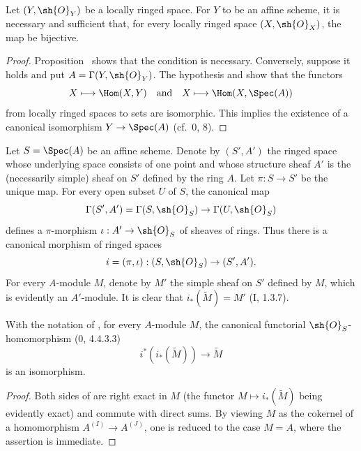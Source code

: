\begin{corollary}[1.8.3]
\label{ega2:addendum:I.1.8.3}
Let $(Y,\sh{O}_Y)$ be a locally ringed space.  For $Y$ to be an affine
scheme, it is necessary and sufficient that, for every locally ringed
space $(X,\sh{O}_X)$, the map  be bijective.
\end{corollary}

\begin{proof}
Proposition~ shows that the condition is necessary.
Conversely, suppose it holds and put $A=\Gamma(Y,\sh{O}_Y)$.  The
hypothesis and  show that the functors
\[
  X\longmapsto\Hom(X,Y)
  \quad\hbox{and}\quad
  X\longmapsto\Hom(X,\Spec(A))
\]
from locally ringed spaces to sets are isomorphic.  This implies the
existence of a canonical isomorphism $Y\to\Spec(A)$ (cf.~0, 8).
\end{proof}

\begin{env}[1.8.4]
\label{ega2:addendum:I.1.8.4}
Let $S=\Spec(A)$ be an affine scheme.  Denote by $(S',A')$ the ringed
space whose underlying space consists of one point and whose
structure sheaf $A'$ is the (necessarily simple) sheaf on $S'$ defined
by the ring $A$.  Let $\pi:S\to S'$ be the unique map.  For every open
subset $U$ of $S$, the canonical map
\[
  \Gamma(S',A')=\Gamma(S,\sh{O}_S)\to\Gamma(U,\sh{O}_S)
\]
defines a $\pi$-morphism $\iota:A'\to\sh{O}_S$ of sheaves of rings.
Thus there is a canonical morphism of ringed spaces
\[
  i=(\pi,\iota):(S,\sh{O}_S)\to(S',A').
\]
For every $A$-module $M$, denote by $M'$ the simple sheaf on $S'$
defined by $M$, which is evidently an $A'$-module.  It is clear that
$i_*(\widetilde M)=M'$ (I, 1.3.7).
\end{env}

\begin{lemma}[1.8.5]
\label{ega2:addendum:I.1.8.5}
With the notation of , for every $A$-module $M$, the
canonical functorial $\sh{O}_S$-homomorphism (0, 4.4.3.3)
\begin{equation}
\label{ega2:addendum:I.1.8.5.1}
  i^*(i_*(\widetilde M))\to\widetilde M
\tag{1.8.5.1}
\end{equation}
is an isomorphism.
\end{lemma}

\begin{proof}
Both sides of  are right exact in $M$ (the functor
$M\mapsto i_*(\widetilde M)$ being evidently exact) and commute with
direct sums.  By viewing $M$ as the cokernel of a homomorphism
$A^{(I)}\to A^{(J)}$, one is reduced to the case $M=A$, where the
assertion is immediate.
\end{proof}

